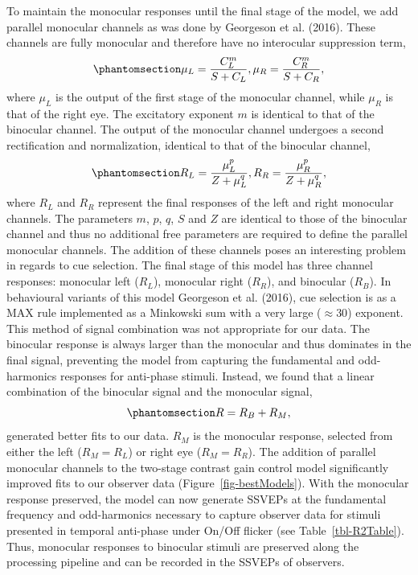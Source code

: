 \documentclass[
  12pt,
]{article}
\begin{document}
To maintain the monocular responses until the final stage of the model,
we add parallel monocular channels as was done by Georgeson et al.
(2016). These channels are fully monocular and therefore have no
interocular suppression term,
\begin{equation}\phantomsection\label{eq-monocFirstStage}{
\mu_L = \frac{C_L^m}{S + C_L},\mu_R = \frac{C_R^m}{S + C_R},
}\end{equation} where \(\mu_L\) is the output of the first stage of the
monocular channel, while \(\mu_R\) is that of the right eye. The
excitatory exponent \(m\) is identical to that of the binocular channel.
The output of the monocular channel undergoes a second rectification and
normalization, identical to that of the binocular channel,
\begin{equation}\phantomsection\label{eq-monocSecondStage}{
R_L = \frac{\mu_L^p}{Z + \mu_L^q},R_R = \frac{\mu_R^p}{Z + \mu_R^q},
}\end{equation} where \(R_L\) and \(R_R\) represent the final responses
of the left and right monocular channels. The parameters \(m\), \(p\),
\(q\), \(S\) and \(Z\) are identical to those of the binocular channel
and thus no additional free parameters are required to define the
parallel monocular channels. The addition of these channels poses an
interesting problem in regards to cue selection. The final stage of this
model has three channel responses: monocular left (\(R_L\)), monocular
right (\(R_R\)), and binocular (\(R_B\)). In behavioural variants of
this model Georgeson et al. (2016), cue selection is as a MAX rule
implemented as a Minkowski sum with a very large (\(\approx 30\))
exponent. This method of signal combination was not appropriate for our
data. The binocular response is always larger than the monocular and
thus dominates in the final signal, preventing the model from capturing
the fundamental and odd-harmonics responses for anti-phase stimuli.
Instead, we found that a linear combination of the binocular signal and
the monocular signal,
\begin{equation}\phantomsection\label{eq-binocMonocComb}{  
R=R_B+R_M,
}\end{equation} generated better fits to our data. \(R_M\) is the
monocular response, selected from either the left (\(R_M = R_L\)) or
right eye (\(R_M = R_R\)). The addition of parallel monocular channels
to the two-stage contrast gain control model significantly improved fits
to our observer data (Figure~\ref{fig-bestModels}). With the monocular
response preserved, the model can now generate SSVEPs at the fundamental
frequency and odd-harmonics necessary to capture observer data for
stimuli presented in temporal anti-phase under On/Off flicker (see
Table~\ref{tbl-R2Table}). Thus, monocular responses to binocular stimuli
are preserved along the processing pipeline and can be recorded in the
SSVEPs of observers.
\end{document}
